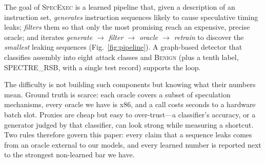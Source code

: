 \documentclass[conference]{IEEEtran}
\newcommand{\cls}[1]{\textsc{#1}}
\begin{document}
The goal of \textsc{SpecExec} is a learned pipeline that, given a description
of an instruction set, \emph{generates} instruction sequences likely to cause
speculative timing leaks; \emph{filters} them so that only the most promising
reach an expensive, precise oracle; and iterates
\emph{generate $\to$ filter $\to$ oracle $\to$ retrain} to discover the
\emph{smallest} leaking sequences (Fig.~\ref{fig:pipeline}). A graph-based
detector that classifies assembly into eight attack classes and \cls{Benign}
(plus a tenth label, SPECTRE\_RSB, with a single test record) supports the
loop.

The difficulty is not building such components but knowing what their numbers
mean. Ground truth is scarce: each oracle covers a subset of speculation
mechanisms, every oracle we have is x86, and a call costs seconds to a
hardware batch slot. Proxies are cheap but easy to over-trust---a classifier's
accuracy, or a generator judged by that classifier, can look strong while
measuring a shortcut. Two rules therefore govern this paper: every claim that a
sequence leaks comes from an oracle external to our models, and every learned
number is reported next to the strongest non-learned bar we have.
\end{document}
